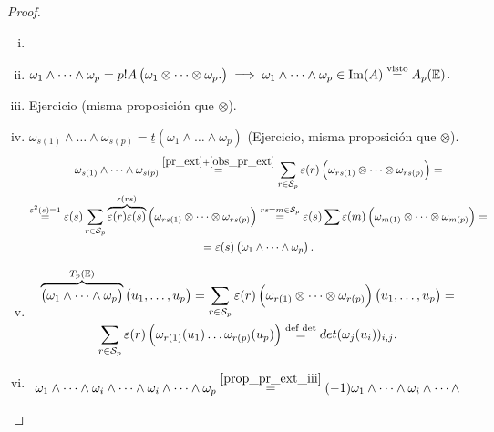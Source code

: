 \begin{proof}
    \begin{enumerate}[i)]
        \item[]
        \item $\omega_1 \wedge \dots \wedge \omega_p = p! A\left(\omega_1 \otimes \dots \otimes \omega_p .
        \right) \implies \omega_1 \wedge \dots \wedge \omega_p \in \operatorname{Im}(A) \stackrel{\text{visto}}{=} A_p(\mathbb{E})$.
        \item Ejercicio (misma proposición que $\otimes$).
        \item $\omega_{s(1)} \wedge \dots \wedge \omega_{s(p)} = \underline{t}(\omega_1 \wedge \dots \wedge
        \omega_p)$ (Ejercicio, misma proposición que $\otimes$).
        \begin{gather*}
            \omega_{s(1)} \wedge \dots \wedge \omega_{s(p)} \stackrel{\ref{pr_ext} + \ref{obs_pr_ext}}{=}
            \sum_{r \in \mathcal{S}_p} \varepsilon(r) \left( \omega_{rs(1)} \otimes \dots \otimes
            \omega_{rs(p)} \right) = \\
            \stackrel{\varepsilon^2(s)=1}{=} \varepsilon(s) \sum_{r \in \mathcal{S}_p} \overbrace{\varepsilon(r)
            \varepsilon(s)}^{\varepsilon(rs)} \left( \omega_{rs(1)} \otimes \dots \otimes\omega_{rs(p)}
            \right) \stackrel{rs = m \in \mathcal{S}_p}{=} \varepsilon(s) \sum \varepsilon(m)
            \left( \omega_{m(1)} \otimes \dots \otimes \omega_{m(p)} \right) = \\
            = \varepsilon(s) \left( \omega_1 \wedge \dots \wedge \omega_p \right).
        \end{gather*}
        \item
        \begin{gather*}
        \overbrace{\left( \omega_1 \wedge \dots \wedge \omega_p \right)}^{T_p(\mathbb{E})} \left(u_1,\dots,u_p
        \right) = \sum_{r\in\mathcal{S}_p} \varepsilon(r) \left( \omega_{r(1)} \otimes \dots \otimes
        \omega_{r(p)} \right) \left( u_1,\dots,u_p \right) = \\
        \sum_{r \in \mathcal{S}_p} \varepsilon(r) \left( \omega_{r(1)}(u_1) \dots \omega_{r(p)}(u_p) \right)
        \stackrel{\text{def det}}{=} det(\omega_j(u_i))_{i,j}.
        \end{gather*}
        \item
        \begin{gather*}
        \omega_1 \wedge \dots \wedge \omega_i \wedge \dots \wedge \omega_i \wedge \dots \wedge \omega_p
        \stackrel{\ref{prop_pr_ext_iii}}{=} (-1) \omega_1 \wedge \dots \wedge \omega_i \wedge \dots \wedge

\end{gather*}
\end{enumerate}
\end{proof}
